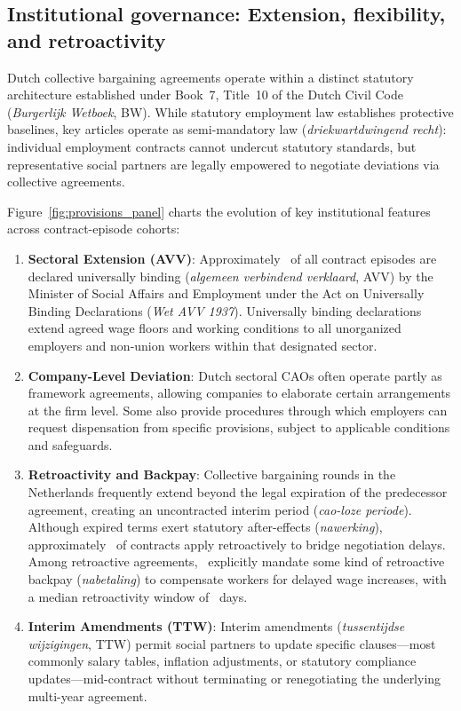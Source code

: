\subsection*{Institutional governance: Extension, flexibility, and retroactivity}

Dutch collective bargaining agreements operate within a distinct statutory architecture established under Book~7, Title~10 of the Dutch Civil Code (\emph{Burgerlijk Wetboek}, BW). While statutory employment law establishes protective baselines, key articles operate as semi-mandatory law (\emph{driekwartdwingend recht}): individual employment contracts cannot undercut statutory standards, but representative social partners are legally empowered to negotiate deviations via collective agreements.

Figure~\ref{fig:provisions_panel} charts the evolution of key institutional features across contract-episode cohorts:

\begin{enumerate}
    \item \textbf{Sectoral Extension (AVV)}: Approximately \GenShareAvv\ of all contract episodes are declared universally binding (\emph{algemeen verbindend verklaard}, AVV) by the Minister of Social Affairs and Employment under the Act on Universally Binding Declarations (\emph{Wet AVV 1937}). Universally binding declarations extend agreed wage floors and working conditions to all unorganized employers and non-union workers within that designated sector.
    \item \textbf{Company-Level Deviation}: Dutch sectoral CAOs often operate partly as framework agreements, allowing companies to elaborate certain arrangements at the firm level. Some also provide procedures through which employers can request dispensation from specific provisions, subject to applicable conditions and safeguards.
    \item \textbf{Retroactivity and Backpay}: Collective bargaining rounds in the Netherlands frequently extend beyond the legal expiration of the predecessor agreement, creating an uncontracted interim period (\emph{cao-loze periode}). Although expired terms exert statutory after-effects (\emph{nawerking}), approximately \GenShareRetro\ of contracts apply retroactively to bridge negotiation delays. Among retroactive agreements, \GenShareBackpayCond\ explicitly mandate some kind of retroactive backpay (\emph{nabetaling}) to compensate workers for delayed wage increases, with a median retroactivity window of \GenMedianRetroDays\ days.
    \item \textbf{Interim Amendments (TTW)}: Interim amendments (\emph{tussentijdse wijzigingen}, TTW) permit social partners to update specific clauses—most commonly salary tables, inflation adjustments, or statutory compliance updates—mid-contract without terminating or renegotiating the underlying multi-year agreement.
\end{enumerate}


